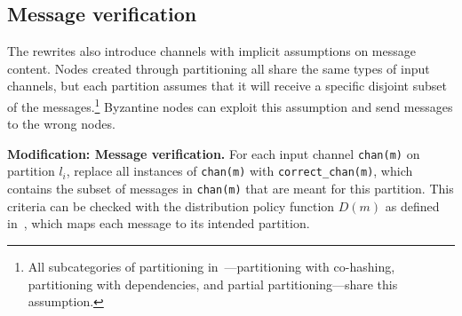 



\subsection{Message verification}
\label{sec:message-verification}

The rewrites also introduce channels with implicit assumptions on message content.
Nodes created through partitioning all share the same types of input channels, but each partition assumes that it will receive a specific disjoint subset of the messages.\footnote{All subcategories of partitioning in~\cite{autocomp}---partitioning with co-hashing, partitioning with dependencies, and partial partitioning---share this assumption.}
Byzantine nodes can exploit this assumption and send messages to the wrong nodes.

\textbf{Modification: Message verification.}
For each input channel \texttt{chan(m)} on partition $l_i$, replace all instances of \texttt{chan(m)} with \texttt{correct\_chan(m)}, which contains the subset of messages in \texttt{chan(m)} that are meant for this partition.
This criteria can be checked with the distribution policy function $D(m)$ as defined in~\cite{autocomp}, which maps each message to its intended partition.


